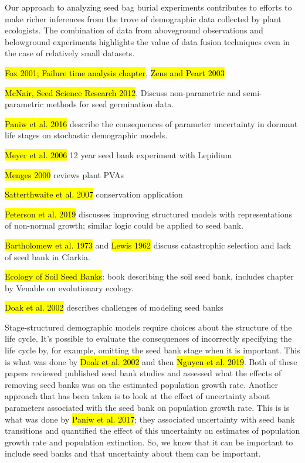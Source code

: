 \documentclass[12pt, oneside, titlepage]{article}   	%
\begin{document}
Our approach to analyzing seed bag burial experiments contributes to efforts to make richer inferences from the trove of demographic data collected by plant ecologists. The combination of data from aboveground observations and belowground experiments highlights the value of data fusion techniques even in the case of relatively small datasets.  

\hl{Fox 2001; Failure time analysis chapter}, \hl{Zens and Peart 2003}

\hl{McNair, Seed Science Research 2012}. Discuss non-parametric and semi-parametric methods for seed germination data.

\hl{Paniw et al. 2016} describe the consequences of parameter uncertainty in dormant life stages on stochastic demographic models.

\hl{Meyer et al. 2006} 12 year seed bank experiment with Lepidium

\hl{Menges 2000} reviews plant PVAs

\hl{Satterthwaite et al. 2007} conservation application

\hl{Peterson et al. 2019} discusses improving structured models with representations of non-normal growth; similar logic could be applied to seed bank.

\hl{Bartholomew et al. 1973} and \hl{Lewis 1962} discuss catastrophic selection and lack of seed bank in Clarkia. 

\hl{Ecology of Soil Seed Banks}: book describing the soil seed bank, includes chapter by Venable on evolutionary ecology.

\hl{Doak et al. 2002} describes challenges of modeling seed banks

Stage-structured demographic models require choices about the structure of the life cycle. It's possible to evaluate the consequences of incorrectly specifying the life cycle by, for example, omitting the seed bank stage when it is important. This is what was done by \hl{Doak et al. 2002} and then \hl{Nguyen et al. 2019}. Both of these papers reviewed published seed bank studies and assessed what the effects of removing seed banks was on the estimated population growth rate. Another approach that has been taken is to look at the effect of uncertainty about parameters associated with the seed bank on population growth rate. This is is what was done by \hl{Paniw et al. 2017}; they associated uncertainty with seed bank transitions and quantified the effect of this uncertainty on estimates of population growth rate and population extinction. So, we know that it can be important to include seed banks and that uncertainty about them can be important.
\end{document}
